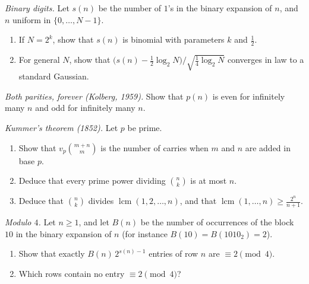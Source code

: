 \begin{exercise}[$\star\star$]\label{pb:digitsclt}
\emph{Binary digits.} Let $s(n)$ be the number of $1$'s in the binary expansion of $n$, and $n$ uniform in $\{0,\dots,N-1\}$.
\begin{enumerate}[label=(\alph*)]
\item If $N=2^k$, show that $s(n)$ is binomial with parameters $k$ and $\frac12$.
\item For general $N$, show that $\bigl(s(n)-\frac12\log_2N\bigr)/\sqrt{\frac14\log_2N}$ converges in law to a standard Gaussian.
\end{enumerate}
\end{exercise}

\begin{exercise}[$\star\star$]\label{pb:kolberg}
\emph{Both parities, forever (Kolberg, 1959).} Show that $p(n)$ is even for infinitely many $n$ and odd for infinitely many $n$.
\end{exercise}

\begin{exercise}[$\star\star$]\label{pb:kummer}
\emph{Kummer's theorem (1852).} Let $p$ be prime.
\begin{enumerate}[label=(\alph*)]
\item Show that $v_p\binom{m+n}m$ is the number of carries when $m$ and $n$ are added in base $p$.
\item Deduce that every prime power dividing $\binom nk$ is at most $n$.
\item Deduce that $\binom nk$ divides $\operatorname{lcm}(1,2,\dots,n)$, and that $\operatorname{lcm}(1,\dots,n)\ge\frac{2^n}{n+1}$.
\end{enumerate}
\end{exercise}

\begin{exercise}[$\star\star$]\label{pb:pascalfour}
\emph{Modulo $4$.} Let $n\ge1$, and let $B(n)$ be the number of occurrences of the block $10$ in the binary expansion of $n$
(for instance $B(10)=B(1010_2)=2$).
\begin{enumerate}[label=(\alph*)]
\item Show that exactly $B(n)\,2^{s(n)-1}$ entries of row $n$ are $\equiv2\pmod4$.
\item Which rows contain no entry $\equiv2\pmod4$?
\end{enumerate}
\end{exercise}


